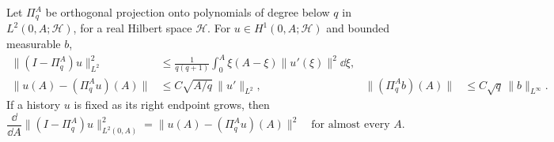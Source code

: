 \begin{lemma}
\label{lem:at-projection}
Let $\Pi_q^A$ be orthogonal projection onto polynomials of degree below
$q$ in $L^2(0,A;\mathcal H)$, for a real Hilbert space $\mathcal H$.
For $u\in H^1(0,A;\mathcal H)$ and bounded measurable $b$,
\begin{align}
 \|(I-\Pi_q^A)u\|_{L^2}^2
 &\le\frac1{q(q+1)}\int_0^A\xi(A-\xi)\|u'(\xi)\|^2\dd\xi,
 \label{eq:at-weighted-tail}\\
 \|u(A)-(\Pi_q^Au)(A)\|
 &\le C\sqrt{A/q}\,\|u'\|_{L^2},&
 \|(\Pi_q^Ab)(A)\|&\le C\sqrt q\,\|b\|_{L^\infty}.
 \label{eq:at-endpoint}
\end{align}
If a history $u$ is fixed as its right endpoint grows, then
\begin{equation}
 \frac{\dd}{\dd A}\|(I-\Pi_q^A)u\|_{L^2(0,A)}^2
   =\|u(A)-(\Pi_q^Au)(A)\|^2
 \quad\text{for almost every }A.
 \label{eq:at-growing-energy}
\end{equation}
\end{lemma}
